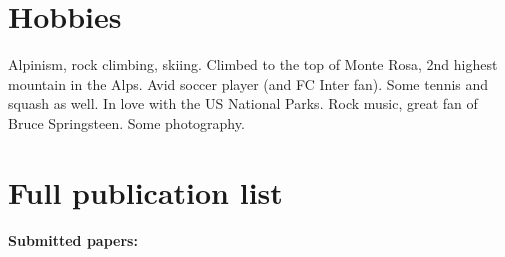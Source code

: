 \documentclass[a4paper]{moderncv}
\begin{document}
\section{Hobbies}
Alpinism, rock climbing, skiing. Climbed to the top of Monte Rosa, 2nd highest mountain in the Alps.
\newline{}
Avid soccer player (and FC Inter fan). Some tennis and squash as well. In love with the US National Parks.
\newline{}
Rock music, great fan of Bruce Springsteen. Some photography.%



\pagebreak
\section{Full publication list}\vspace{0.2cm} 


\textcolor{color1}{\textbf{Submitted papers:}}
\vspace{-0.5cm}
\end{document}
